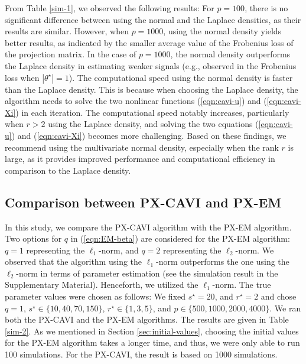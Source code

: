 \documentclass[pdftex, noinfoline, letter]{imsart}
\theoremstyle{plain}
\begin{document}
From Table \ref{sim-1}, we observed the following results:
For $p = 100$, there is no significant difference between using the normal and the Laplace densities, as their results are similar. However, when $p = 1000$, using the normal density yields better results, as indicated by the smaller average value of the Frobenius loss of the projection matrix.
In the case of $p = 1000$, the normal density outperforms the Laplace density in estimating weaker signals (e.g., observed in the Frobenius loss when $|\theta^\star| = 1$). The computational speed using the normal density is faster than the Laplace density. This is because when choosing the Laplace density, the algorithm needs to solve the two nonlinear functions (\ref{eqn:cavi-u}) and (\ref{eqn:cavi-Xi}) in each iteration. The computational speed notably increases, particularly when $r > 2$ using the Laplace density, and solving the two equations (\ref{eqn:cavi-u}) and (\ref{eqn:cavi-Xi}) becomes more challenging. Based on these findings, we recommend using the multivariate normal density, especially when the rank $r$ is large, as it provides improved performance and computational efficiency in comparison to the Laplace density.

\subsection{Comparison between PX-CAVI and PX-EM}

In this study, we compare the PX-CAVI algorithm with the PX-EM algorithm. Two options for $q$ in (\ref{eqn:EM-beta}) are considered for the PX-EM algorithm: $q = 1$ representing the $\ell_1$-norm, and $q = 2$ representing the $\ell_2$-norm. We observed that the algorithm using the $\ell_1$-norm outperforms the one using the $\ell_2$-norm in terms of parameter estimation  (see the simulation result in the Supplementary Material). Henceforth, we utilized the $\ell_1$-norm. The true parameter values were chosen as follows: We fixed $s^\star = 20$, and $r^\star = 2$ and chose $q = 1$, $s^\star \in \{10, 40, 70, 150\}$, $r^\star \in \{1,3,5\}$, and $p \in \{500, 1000, 2000, 4000\}$.
We ran both the PX-CAVI and the PX-EM algorithms. The results are given in Table \ref{sim-2}. As we mentioned in Section \ref{sec:initial-values}, choosing the initial values for the PX-EM algorithm takes a longer time, and thus, we were only able to run 100 simulations. For the PX-CAVI, the result is based on 1000 simulations. 
\end{document}
